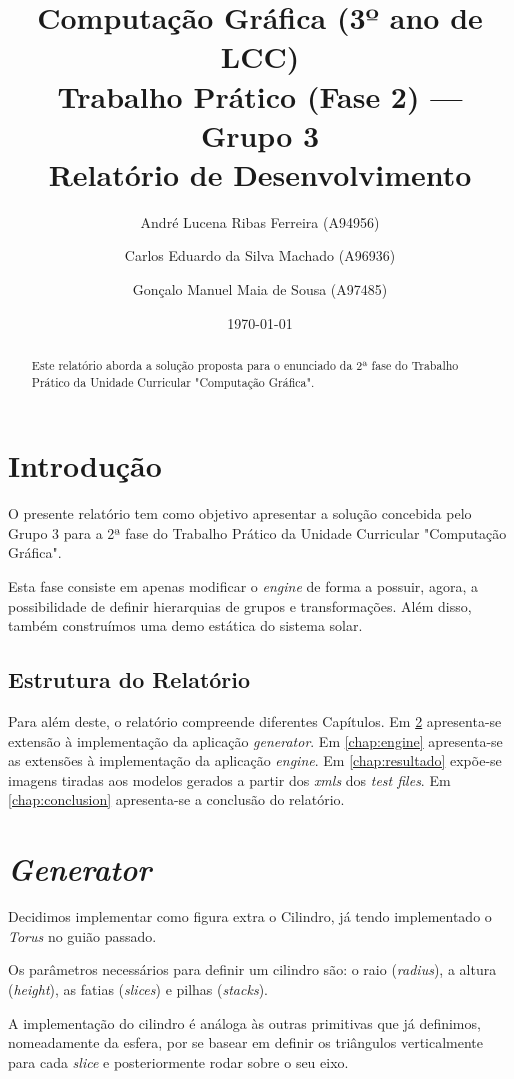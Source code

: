\documentclass[14pt, a4 paper]{report}
\title{Computação Gráfica (3º ano de LCC)\\
       \textbf{Trabalho Prático (Fase 2) — Grupo 3}\\ Relatório de Desenvolvimento}
\author{André Lucena Ribas Ferreira (A94956) 
    \and Carlos Eduardo da Silva Machado (A96936)
    \and Gonçalo Manuel Maia de Sousa (A97485)}
\date{\today} %
\begin{document}
\maketitle

\begin{abstract}
    Este relatório aborda a solução proposta para o enunciado da 2ª fase do Trabalho Prático da Unidade Curricular "Computação Gráfica". 
\end{abstract}

\tableofcontents

\chapter{Introdução} \label{chap:intro}

O presente relatório tem como objetivo apresentar a solução concebida pelo Grupo 3 para a 2ª fase do Trabalho Prático da Unidade Curricular "Computação Gráfica". 

Esta fase consiste em apenas modificar o \textit{engine} de forma a possuir, agora, a possibilidade de definir hierarquias de grupos e transformações. Além disso, também construímos uma demo estática do sistema solar.


\section{Estrutura do Relatório}

Para além deste, o relatório compreende diferentes Capítulos. Em \ref{chap:generator} apresenta-se extensão à implementação da aplicação \textit{generator}. Em \ref{chap:engine} apresenta-se as extensões à implementação da aplicação \textit{engine}. Em \ref{chap:resultado} expõe-se imagens tiradas aos modelos gerados a partir dos \textit{xmls} dos \textit{test files}.
Em \ref{chap:conclusion} apresenta-se a conclusão do relatório.

\chapter{\textit{Generator}} \label{chap:generator}

Decidimos implementar como figura extra o Cilindro, já tendo implementado o \textit{Torus} no guião passado.

Os parâmetros necessários para definir um cilindro são: o raio (\textit{radius}), a altura (\textit{height}), as fatias (\textit{slices}) e pilhas (\textit{stacks}).

A implementação do cilindro é análoga às outras primitivas que já definimos, nomeadamente da esfera, por se basear em definir os triângulos verticalmente para cada \textit{slice} e posteriormente rodar sobre o seu eixo.
\end{document}

